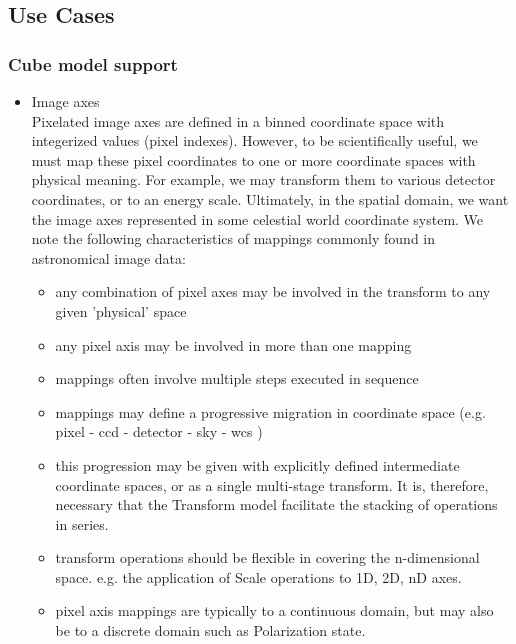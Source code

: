 \documentclass[11pt,a4paper]{ivoa}
\begin{document}
\subsection{Use Cases}
\label{sect:usecases}

\subsubsection{Cube model support}
\label{uc:Cube-model-support}

\begin{itemize}
\item Image axes \\
  Pixelated image axes are defined in a binned coordinate space with integerized values (pixel indexes).  However, 
  to be scientifically useful, we must map these pixel coordinates to one or more coordinate spaces with physical 
  meaning.  For example, we may transform them to various detector coordinates, or to an energy scale.  Ultimately, in 
  the spatial domain, we want the image axes represented in some celestial world coordinate system.  We note the following
  characteristics of mappings commonly found in astronomical image data:

  \begin{itemize}
    \item any combination of pixel axes may be involved in the transform to any given 'physical' space
    \item any pixel axis may be involved in more than one mapping
    \item mappings often involve multiple steps executed in sequence
    \item mappings may define a progressive migration in coordinate space (e.g. pixel - ccd - detector - sky - wcs )
    \item this progression may be given with explicitly defined intermediate coordinate spaces, or 
          as a single multi-stage transform.  It is, therefore, necessary that the Transform model facilitate the stacking of 
          operations in series.
    \item transform operations should be flexible in covering the n-dimensional space. e.g. the application of Scale operations to 1D, 2D, nD axes.
    \item pixel axis mappings are typically to a continuous domain, but may also be to a discrete domain such as Polarization state. 
  \end{itemize}


\end{itemize}
\end{document}

